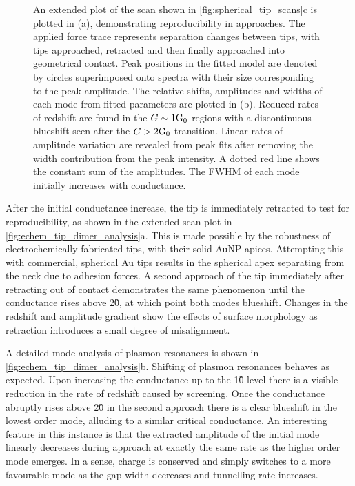 \documentclass[a4paper, 11pt]{article}
\begin{document}
\begin{figure}[bt]
{An extended plot of the  scan shown in \autoref{fig:spherical_tip_scans}c is plotted in (a), demonstrating reproducibility in approaches. The applied force trace represents separation changes between tips, with tips approached, retracted and then finally approached into geometrical contact. Peak positions in the fitted model are denoted by circles superimposed onto spectra with their size corresponding to the peak amplitude. The relative shifts, amplitudes and widths of each mode from fitted parameters are plotted in (b). Reduced rates of redshift are found in the $G\sim1\mathrm{G_{0}}$ regions with a discontinuous blueshift seen after the $G>2\mathrm{G_{0}}$ transition. Linear rates of amplitude variation are revealed from peak fits after removing the width contribution from the peak intensity. A dotted red line shows the constant sum of the amplitudes. The FWHM of each mode initially increases with conductance.}
\label{fig:echem_tip_dimer_analysis}
\end{figure}

After the initial conductance increase, the tip is immediately retracted to test for reproducibility, as shown in the extended scan plot in \autoref{fig:echem_tip_dimer_analysis}a. This is made possible by the robustness of electrochemically fabricated tips, with their solid AuNP apices. Attempting this with commercial, spherical Au tips results in the spherical apex separating from the neck due to adhesion forces. A second approach of the tip immediately after retracting out of contact demonstrates the same phenomenon until the conductance rises above 2\G0, at which point both modes blueshift. Changes in the redshift and amplitude gradient show the effects of surface morphology as retraction introduces a small degree of misalignment.

A detailed mode analysis of plasmon resonances is shown in \autoref{fig:echem_tip_dimer_analysis}b. Shifting of plasmon resonances behaves as expected. Upon increasing the conductance up to the 1\G0 level there is a visible reduction in the rate of redshift caused by screening. Once the conductance abruptly rises above 2\G0 in the second approach there is a clear blueshift in the lowest order mode, alluding to a similar critical conductance. An interesting feature in this instance is that the extracted amplitude of the initial mode linearly decreases during approach at exactly the same rate as the higher order mode emerges. In a sense, charge is conserved and simply switches to a more favourable mode as the gap width decreases and tunnelling rate increases.
\end{document}
